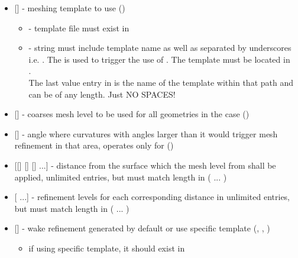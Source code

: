 \begin{itemize}
    \item {} [] - meshing template to use ()
    \begin{itemize}
        \item {} - template file must exist in \\ 
        \item {} -  string must include  template name as well as  separated by underscores i.e. . The  is used to trigger the use of . The template must be located in \\
        .\\
        The last value entry in  is the name of the template within that path and can be of any length. Just NO SPACES!
    \end{itemize}

    \item {} [] - coarses mesh level to be used for all geometries in the case ()
    
    \item {} [] - angle where curvatures with angles larger than it would trigger mesh refinement in that area, operates only for  ()
    
    \item {} [[] [] [] ...] - distance from the surface which the mesh level from  shall be applied, unlimited entries, but must match length in  (  ... )
    
    \item {} [  ...] - refinement levels for each corresponding distance in  unlimited entries, but must match length in  (  ... )
    
    \item {} [] - wake refinement generated by default or use specific template (, , )
    \begin{itemize}
        \item if using specific template, it should exist in \\
    \end{itemize}


\end{itemize}
